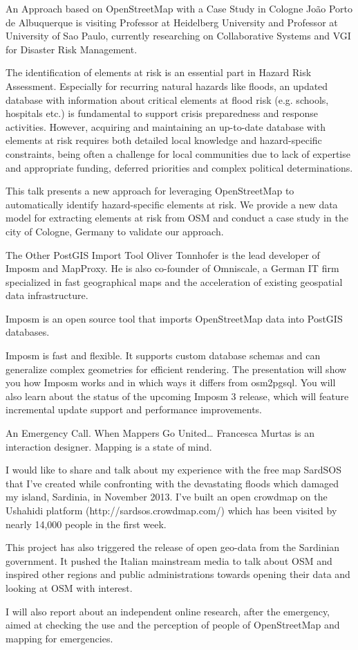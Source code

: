 %
{An Approach based on OpenStreetMap with a Case Study in Cologne}%
{João Porto de Albuquerque is visiting Professor at Heidelberg University and Professor at University of Sao Paulo, currently researching on Collaborative Systems and VGI for Disaster Risk Management. }%
{The identification of elements at risk is an essential part in Hazard Risk Assessment. Especially for recurring natural hazards like floods, an updated database with information about critical elements at flood risk (e.g. schools, hospitals etc.) is fundamental to support crisis preparedness and response activities. However, acquiring and maintaining an up-to-date database with elements at risk requires both detailed local knowledge and hazard-specific constraints, being often a challenge for local communities due to lack of expertise and appropriate funding, deferred priorities and complex political determinations.

This talk presents a new approach for leveraging OpenStreetMap to automatically identify hazard-specific elements at risk. We provide a new data model for extracting elements at risk from OSM and conduct a case study in the city of Cologne, Germany to validate our approach.}

%
{The Other PostGIS Import Tool}%
{Oliver Tonnhofer is the lead developer of Imposm and MapProxy. He is also co-founder of Omniscale, a German IT firm specialized in fast geographical maps and the acceleration of existing geospatial data infrastructure.}%
{Imposm is an open source tool that imports OpenStreetMap data into PostGIS databases.

Imposm is fast and flexible. It supports custom database schemas and can generalize complex geometries for efficient rendering.
The presentation will show you how Imposm works and in which ways it differs from osm2pgsql. You will also learn about the status of the upcoming Imposm 3 release, which will feature incremental update support and performance improvements.}

%
{An Emergency Call. When Mappers Go United\dots}%
{Francesca Murtas is an interaction designer. Mapping is a state of mind.}%
{I would like to share and talk about my experience with the free map SardSOS that I've created while confronting with the devastating floods which damaged my island, Sardinia, in November 2013. I've built an open crowdmap on the Ushahidi platform (http://sardsos.crowdmap.com/) which has been visited by nearly 14,000 people in the first week.

This project has also triggered the release of open geo-data from the Sardinian government. It pushed the Italian mainstream media to talk about OSM and inspired other regions and public administrations towards opening their data and looking at OSM with interest.

I will also report about an independent online research, after the emergency, aimed at checking the use and the perception of people of OpenStreetMap and mapping for emergencies.}

